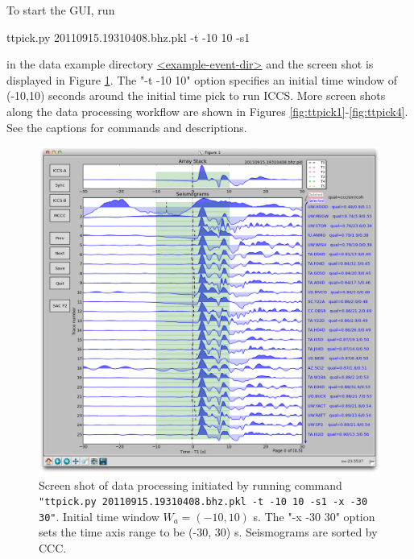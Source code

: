 \documentclass[12pt, titlepage]{article}
\newenvironment{lyxcode}
{\begin{list}{}{
\setlength{\rightmargin}{\leftmargin}
\setlength{\listparindent}{0pt}%
\raggedright
\setlength{\itemsep}{0pt}
\setlength{\parsep}{0pt}
\normalfont\ttfamily}%
 \item[]}
{\end{list}}
\begin{document}
To start the GUI, run 

\begin{lyxcode}
ttpick.py 20110915.19310408.bhz.pkl -t -10 10 -s1
\end{lyxcode}

in the data example directory \url{<example-event-dir>} and the screen shot is displayed in Figure \ref{fig:ttpicka}.
The "-t -10 10" option specifies an initial time window of (-10,10) seconds around the initial time pick to run ICCS.
More screen shots along the data processing workflow are shown in Figures \ref{fig:ttpick1}-\ref{fig:ttpick4}. See the captions for commands and descriptions.







\begin{figure}[!h]
    \centering
    \includegraphics[width = 0.94 \textwidth]{figs/snapshots/ttpick-r1-s1-all.png}
    \caption{Screen shot of data processing initiated by running command \texttt{"ttpick.py 20110915.19310408.bhz.pkl -t -10 10 -s1 -x -30 30"}. Initial time window $W_a= (-10, 10)$ s. The "-x -30 30" option sets the time axis range to be (-30, 30) s. Seismograms are sorted by CCC.
    }
    \label{fig:ttpicka}
\end{figure}
\end{document}
